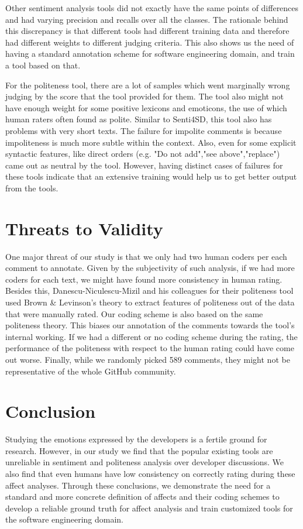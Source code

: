 Other sentiment analysis tools did not exactly have the same points of differences and had varying precision and recalls over all the classes. The rationale behind this discrepancy is that different tools had different training data and therefore had different weights to different judging criteria. This also shows us the need of having a standard annotation scheme for software engineering domain, and train a tool based on that.

For the politeness tool, there are a lot of samples which went marginally wrong judging by the score that the tool provided for them. The tool also might not have enough weight for some positive lexicons and emoticons, the use of which human raters often found as polite. Similar to Senti4SD, this tool also has problems with very short texts. The failure for impolite comments is because impoliteness is much more subtle within the context. Also, even for some explicit syntactic features, like direct orders (e.g. "Do not add","see above","replace") came out as neutral by the tool. However, having distinct cases of failures for these tools indicate that an extensive training would help us to get better output from the tools.

\section{Threats to Validity}
One major threat of our study is that we only had two human coders per each comment to annotate. Given by the subjectivity of such analysis, if we had more coders for each text, we might have found more consistency in human rating. Besides this, Danescu-Niculescu-Mizil and his colleagues for their politeness tool used Brown \& Levinson's theory to extract features of politeness out of the data that were manually rated. Our coding scheme is also based on the same politeness theory. This biases our annotation of the comments towards the tool's internal working. If we had a different or no coding scheme during the rating, the performance of the politeness with respect to the human rating could have come out worse. 
Finally, while we randomly picked 589 comments, they might not be representative of the whole GitHub community.

\section{Conclusion}
Studying the emotions expressed by the developers is a fertile ground for research. However, in our study we find that the popular existing tools are unreliable in sentiment and politeness analysis over developer discussions. We also find that even humans have low consistency on correctly rating during these affect analyses. Through these conclusions, we demonstrate the need for a standard and more concrete definition of affects and their coding schemes to develop a reliable ground truth for affect analysis and train customized tools for the software engineering domain.  





